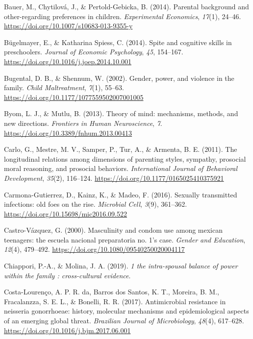 \documentclass[
  english,
  donotrepeattitle,doc, 12pt, a4paper,floatsintext]{apa7}
\newlength{\cslhangindent}
\newlength{\cslentryspacingunit} %
\newenvironment{CSLReferences}[2] %
 {%
  \setlength{\parindent}{0pt}
  \ifodd #1
  \let\oldpar\par
  \def\par{\hangindent=\cslhangindent\oldpar}
  \fi
  \setlength{\parskip}{#2\cslentryspacingunit}
 }%
 {}
\begin{document}
\begin{CSLReferences}{1}{0}
\leavevmode{}%
Bauer, M., Chytilová, J., \& Pertold-Gebicka, B. (2014). Parental background and other-regarding preferences in children. \emph{Experimental Economics}, \emph{17}(1), 24--46. \url{https://doi.org/10.1007/s10683-013-9355-y}

\leavevmode{}%
Bügelmayer, E., \& Katharina Spiess, C. (2014). Spite and cognitive skills in preschoolers. \emph{Journal of Economic Psychology}, \emph{45}, 154--167. \url{https://doi.org/10.1016/j.joep.2014.10.001}

\leavevmode{}%
Bugental, D. B., \& Shennum, W. (2002). Gender, power, and violence in the family. \emph{Child Maltreatment}, \emph{7}(1), 55--63. \url{https://doi.org/10.1177/1077559502007001005}

\leavevmode{}%
Byom, L. J., \& Mutlu, B. (2013). Theory of mind: mechanisms, methods, and new directions. \emph{Frontiers in Human Neuroscience}, \emph{7}. \url{https://doi.org/10.3389/fnhum.2013.00413}

\leavevmode{}%
Carlo, G., Mestre, M. V., Samper, P., Tur, A., \& Armenta, B. E. (2011). The longitudinal relations among dimensions of parenting styles, sympathy, prosocial moral reasoning, and prosocial behaviors. \emph{International Journal of Behavioral Development}, \emph{35}(2), 116--124. \url{https://doi.org/10.1177/0165025410375921}

\leavevmode{}%
Carmona-Gutierrez, D., Kainz, K., \& Madeo, F. (2016). Sexually transmitted infections: old foes on the rise. \emph{Microbial Cell}, \emph{3}(9), 361--362. \url{https://doi.org/10.15698/mic2016.09.522}

\leavevmode{}%
Castro-Vázquez, G. (2000). Masculinity and condom use among mexican teenagers: the escuela nacional preparatoria no. 1's case. \emph{Gender and Education}, \emph{12}(4), 479--492. \url{https://doi.org/10.1080/09540250020004117}

\leavevmode{}%
Chiappori, P.-A., \& Molina, J. A. (2019). \emph{1 the intra-spousal balance of power within the family : cross-cultural evidence}.

\leavevmode{}%
Costa-Lourenço, A. P. R. da, Barros dos Santos, K. T., Moreira, B. M., Fracalanzza, S. E. L., \& Bonelli, R. R. (2017). Antimicrobial resistance in neisseria gonorrhoeae: history, molecular mechanisms and epidemiological aspects of an emerging global threat. \emph{Brazilian Journal of Microbiology}, \emph{48}(4), 617--628. \url{https://doi.org/10.1016/j.bjm.2017.06.001}


\end{CSLReferences}
\end{document}
